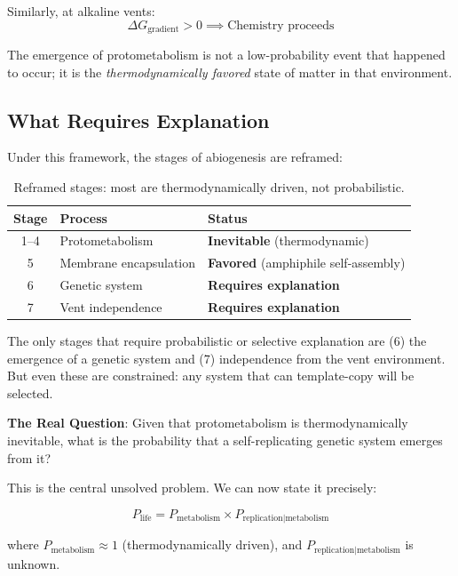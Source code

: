 \documentclass[11pt,twocolumn]{article}
\begin{document}
Similarly, at alkaline vents:
\begin{equation}
\Delta G_{\text{gradient}} > 0 \implies \text{Chemistry proceeds}
\end{equation}

The emergence of protometabolism is not a low-probability event that happened to occur; it is the \textit{thermodynamically favored} state of matter in that environment.

\subsection{What Requires Explanation}

Under this framework, the stages of abiogenesis are reframed:

\begin{table}[h]
\centering
\begin{tabular}{cll}
\hline
Stage & Process & Status \\
\hline
1--4 & Protometabolism & \textbf{Inevitable} (thermodynamic) \\
5 & Membrane encapsulation & \textbf{Favored} (amphiphile self-assembly) \\
6 & Genetic system & \textbf{Requires explanation} \\
7 & Vent independence & \textbf{Requires explanation} \\
\hline
\end{tabular}
\caption{Reframed stages: most are thermodynamically driven, not probabilistic.}
\label{tab:stages}
\end{table}

The only stages that require probabilistic or selective explanation are (6) the emergence of a genetic system and (7) independence from the vent environment. But even these are constrained: any system that can template-copy will be selected.

\textbf{The Real Question}: Given that protometabolism is thermodynamically inevitable, what is the probability that a self-replicating genetic system emerges from it?

This is the central unsolved problem. We can now state it precisely:

\begin{equation}
P_{\text{life}} = P_{\text{metabolism}} \times P_{\text{replication}|\text{metabolism}}
\end{equation}

where $P_{\text{metabolism}} \approx 1$ (thermodynamically driven), and $P_{\text{replication}|\text{metabolism}}$ is unknown.
\end{document}
